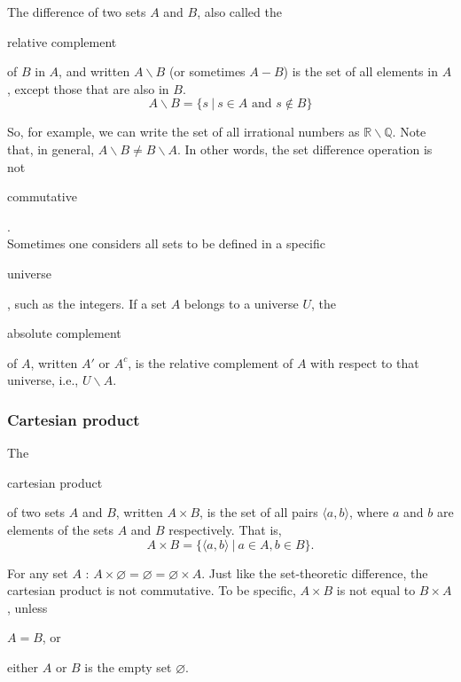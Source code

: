 \documentclass[11pt]{article}
\theoremstyle{plain}
\theoremstyle{definition}
\newenvironment{packed_items}{
\begin{itemize}
  \setlength{\itemsep}{1pt}
  \setlength{\parskip}{0pt}
  \setlength{\parsep}{0pt}
}{\end{itemize}}
\begin{document}
\begin{center}
  \def\svgwidth{0.3\columnwidth}
  
\end{center}

\noindent The difference of two sets $ A $ and $ B $, also called the \begin{em}relative complement\end{em} of $ B $ in $ A $, and written $ A \backslash B $ (or sometimes $ A - B $) is the set of all elements in $ A $, except those that are also in $ B $.
$$
A \backslash B = \{ s \ | \ s \in A \text{ and } s \notin B \} 
$$

\noindent So, for example, we can write the set of all irrational numbers as $ \mathbb{R} \backslash \mathbb{Q} $. Note that, in general, $ A \backslash B \ne B \backslash A $. In other words, the set difference operation is not \begin{em}commutative\end{em}.  \\
  
\noindent Sometimes one considers all sets to be defined in a specific \begin{em}universe\end{em}, such as the integers. If a set $ A $ belongs to a universe $ U $, the \begin{em}absolute complement\end{em} of $ A $, written $ A' $ or $ A^c $, is the relative complement of $ A $ with respect to that universe, i.e., $ U \backslash A $. \\

\begin{center}
  \def\svgwidth{0.3\columnwidth}
  
\end{center}

\subsubsection*{Cartesian product}

The \begin{em}cartesian product\end{em} of two sets $ A $ and $ B $, written $ A \times B $, is the set of all pairs $ \langle a, b \rangle $, where $ a $ and $ b $ are elements of the sets $ A $ and $ B $ respectively. That is,
$$
A \times B = \{ \langle a, b \rangle \ | \ a \in A, b \in B \}.
$$

\noindent For any set $ A $ : $ A \times \varnothing = \varnothing = \varnothing \times A $. Just like the set-theoretic difference, the cartesian product is not commutative. To be specific, $ A \times B $ is not equal to $ B \times A $, unless 
\begin{packed_items}
\item $ A = B $, or 
\item either $ A $ or $ B $ is the empty set $ \varnothing $. 
\end{packed_items}
\end{document}
